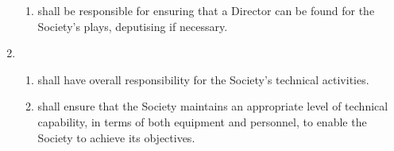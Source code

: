 \documentclass[a4paper]{tufte-handout}
\begin{document}
\begin{enumerate}[resume]
\begin{enumerate}
            \item shall be responsible for ensuring that a Director can be found for the Society's plays, deputising if necessary.
        \end{enumerate}
    \item {}
        \begin{enumerate}
            \item shall have overall responsibility for the Society's technical activities.
            \item shall ensure that the Society maintains an appropriate level of technical capability, in terms of both equipment and personnel, to enable the Society to achieve its objectives.
        \end{enumerate}
\end{enumerate}
\end{document}
